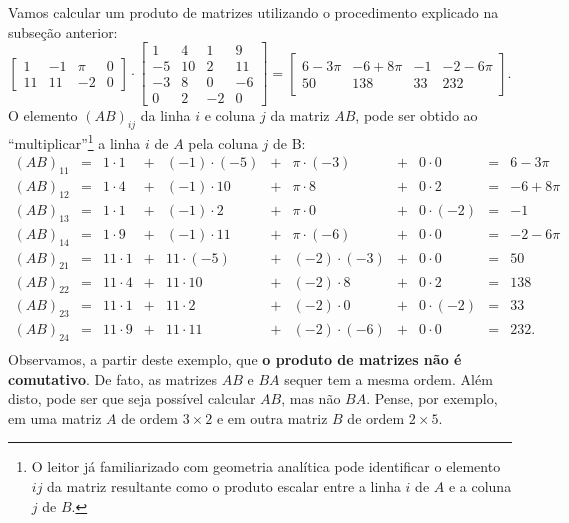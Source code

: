 \begin{ex} Vamos calcular um produto de matrizes utilizando o procedimento explicado na subseção anterior:
	\begin{equation}
	\left[
	\begin{array}{cccc}
	1 & -1 & \pi & 0 \\
	11 & 11 & -2 & 0 
	\end{array}
	\right] \cdot
	\left[
	\begin{array}{cccc}
	1 & 4 & 1 & 9 \\
	-5 & 10 & 2 & 11 \\
	-3 & 8 & 0 & -6 \\
	0 & 2 & -2 & 0 
	\end{array}
	\right]  =
	\left[
	\begin{array}{cccc}
	6-3\pi   & -6 + 8\pi &   -1   &  -2 - 6 \pi  \\
	50      &  138      &  33    &  232         
	\end{array}
	\right].
	\end{equation} O elemento $(AB)_{ij}$ da linha $i$ e coluna $j$ da matriz $AB$, pode ser obtido ao ``multiplicar''\footnote{O leitor já familiarizado com geometria analítica pode identificar o elemento $ij$ da matriz resultante como o produto escalar entre a linha $i$ de $A$ e a coluna $j$ de $B$.} a linha $i$ de $A$ pela coluna $j$ de B:
	\begin{equation}
	\begin{array}{ccccccccccc}
	(AB)_{11} & = & 1\cdot 1 & + & (-1)\cdot(-5)  & + & \pi \cdot (-3) & + & 0\cdot 0    & = & 6-3\pi \\
	(AB)_{12} & = & 1\cdot 4 & + & (-1)\cdot 10   & + & \pi \cdot 8    & + & 0\cdot 2    & = & -6 + 8 \pi \\
	(AB)_{13} & = & 1\cdot 1 & + & (-1)\cdot 2    & + & \pi \cdot 0    & + & 0\cdot (-2) & = & -1 \\
	(AB)_{14} & = & 1\cdot 9 & + & (-1)\cdot 11   & + & \pi \cdot (-6) & + & 0\cdot 0    & = & -2-6\pi \\
	(AB)_{21} & = & 11\cdot 1& + & 11\cdot(-5)    & + & (-2)\cdot(-3)  & + & 0\cdot 0    & = & 50 \\
	(AB)_{22} & = & 11\cdot 4& + & 11\cdot 10     & + & (-2)\cdot 8    & + & 0\cdot 2    & = & 138 \\
	(AB)_{23} & = & 11\cdot 1& + & 11\cdot 2      & + & (-2)\cdot 0    & + & 0\cdot (-2) & = & 33 \\
	(AB)_{24} & = & 11\cdot 9& + & 11\cdot 11     & + & (-2)\cdot (-6) & + & 0\cdot 0    & = & 232. \\
	\end{array}
	\end{equation} Observamos, a partir deste exemplo, que \textbf{o produto de matrizes não é comutativo}. De fato, as matrizes $AB$ e $BA$ sequer tem a mesma ordem. Além disto, pode ser que seja possível calcular $AB$, mas não $BA$. Pense, por exemplo, em uma matriz $A$ de ordem $3 \times 2$ e em outra matriz $B$ de ordem $2 \times 5$.
\end{ex}




